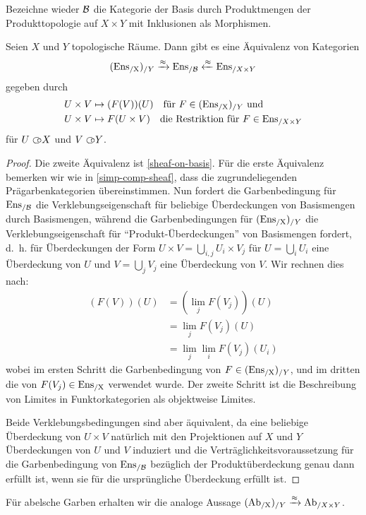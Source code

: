 Bezeichne wieder $\mathcal{B}$ die Kategorie der Basis durch Produktmengen der
Produkttopologie auf $X \times Y$ mit Inklusionen als Morphismen.
\begin{satz} \label{sheaves-prod-topos}
  Seien $X$ und $Y$ topologische Räume. Dann gibt es eine Äquivalenz
  von Kategorien
  \[ (\operatorname{Ens_{/X}})_{/Y} \xrightarrow{\approx} \operatorname{Ens}_{/\mathcal{B}} \xleftarrow{\approx} \operatorname{Ens}_{/X \times Y} \]
  gegeben durch
  \begin{align*}
    U \times V &\mapsto (F(V))(U) \quad
    \text{für } F \in (\operatorname{Ens_{/X}})_{/Y} \text{ und} \\
     U \times V &\mapsto F(U \times V) \quad
     \text{die Restriktion für } F \in \operatorname{Ens}_{/X \times Y}
  \end{align*}
  für $U \subset\kern-0.58em\circ X$ und $V \subset\kern-0.58em\circ Y$.
\end{satz}
\begin{proof}
  Die zweite Äquivalenz ist \ref{sheaf-on-basis}. Für die erste
  Äquivalenz bemerken wir wie in \ref{simp-comp-sheaf}, dass die
  zugrundeliegenden Prägarbenkategorien übereinstimmen. Nun fordert
  die Garbenbedingung für $\operatorname{Ens}_{/\mathcal{B}}$ die Verklebungseigenschaft für
  beliebige Überdeckungen von Basismengen durch Basismengen, während
  die Garbenbedingungen für $(\operatorname{Ens_{/X}})_{/Y}$ die Verklebungseigenschaft
  für ``Produkt-Überdeckungen'' von Basismengen fordert, d.~h. für
  Überdeckungen der Form $U \times V = \bigcup_{i,j} U_i \times V_j$
  für $U = \bigcup_i U_i$ eine Überdeckung von $U$ und $V = \bigcup_j
  V_j$ eine Überdeckung von $V$. Wir rechnen dies nach:
  \begin{align*}
    (F(V))(U)
    &= (\lim_j F(V_j))(U) \\
    &= \lim_j F(V_j)(U) \\
    &= \lim_j \lim_i F(V_j)(U_i)
  \end{align*}
  wobei im ersten Schritt die Garbenbedingung von $F \in
  (\operatorname{Ens_{/X}})_{/Y}$, und im dritten die von $F(V_j) \in \operatorname{Ens_{/X}}$ verwendet
  wurde. Der zweite Schritt ist die Beschreibung von Limites in
  Funktorkategorien als objektweise Limites.

  Beide Verklebungsbedingungen sind aber äquivalent, da eine beliebige
  Überdeckung von $U \times V$ natürlich mit den Projektionen auf $X$
  und $Y$ Überdeckungen von $U$ und $V$ induziert und die
  Verträglichkeitsvoraussetzung für die Garbenbedingung von
  $\operatorname{Ens}_{/\mathcal{B}}$ bezüglich der Produktüberdeckung genau dann erfüllt
  ist, wenn sie für die ursprüngliche Überdeckung erfüllt ist.
\end{proof}
\begin{bem}
  Für abelsche Garben erhalten wir die analoge Aussage $(\operatorname{Ab_{/X}})_{/Y}
  \xrightarrow{\approx} \operatorname{Ab}_{/X \times Y}$.
\end{bem}

